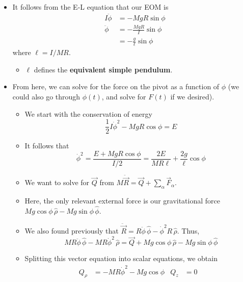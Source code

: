 \documentclass[../notes.tex]{subfiles}
\begin{document}
\begin{itemize}
\begin{itemize}
        \item It follows from the E-L equation that our EOM is
        \begin{align*}
            I\ddot{\phi} &= -MgR\sin\phi\\
            \ddot{\phi} &= -\frac{MgR}{I}\sin\phi\\
            &= -\frac{g}{\ell}\sin\phi
        \end{align*}
        where $\ell=I/MR$.
        \begin{itemize}
            \item $\ell$ defines the \textbf{equivalent simple pendulum}.
        \end{itemize}
        \item From here, we can solve for the force on the pivot as a function of $\phi$ (we could also go through $\phi(t)$, and solve for $F(t)$ if we desired).
        \begin{itemize}
            \item We start with the conservation of energy
            \begin{equation*}
                \frac{1}{2}I\dot{\phi}^2-MgR\cos\phi = E
            \end{equation*}
            \item It follows that
            \begin{equation*}
                \dot{\phi}^2 = \frac{E+MgR\cos\phi}{I/2}
                = \frac{2E}{MR\ell}+\frac{2g}{\ell}\cos\phi
            \end{equation*}
            \item We want to solve for $\vec{Q}$ from $M\ddot{\vec{R}}=\vec{Q}+\sum_\alpha\vec{F}_\alpha$.
            \item Here, the only relevant external force is our gravitational force $Mg\cos\phi\,\hat{\rho}-Mg\sin\phi\,\hat{\phi}$.
            \item We also found previously that $\ddot{\vec{R}}=R\ddot{\phi}\,\hat{\phi}-\dot{\phi}^2R\,\hat{\rho}$. Thus,
            \begin{equation*}
                MR\ddot{\phi}\,\hat{\phi}-MR\dot{\phi}^2\,\hat{\rho} = \vec{Q}+Mg\cos\phi\,\hat{\rho}-Mg\sin\phi\,\hat{\phi}
            \end{equation*}
            \item Splitting this vector equation into scalar equations, we obtain
            \begin{align*}
                Q_\rho &= -MR\dot{\phi}^2-Mg\cos\phi&
                Q_z &= 0&

\end{align*}
\end{itemize}
\end{itemize}
\end{itemize}
\end{document}

